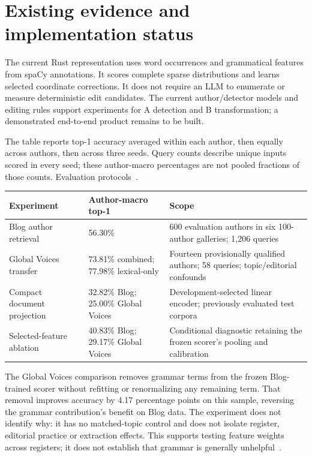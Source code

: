 \section{Existing evidence and implementation
status}\label{existing-evidence-and-implementation-status}

The current Rust representation uses word occurrences and grammatical
features from spaCy annotations. It scores complete sparse distributions
and learns selected coordinate corrections. It does not require an LLM
to enumerate or measure deterministic edit candidates. The current
author/detector models and editing rules support experiments for A
detection and B transformation; a demonstrated end-to-end product remains
to be built.

The table reports top-1 accuracy averaged within each author, then
equally across authors, then across three seeds. Query counts describe
unique inputs scored in every seed; these author-macro percentages are
not pooled fractions of those counts.
Evaluation protocols~\cite{projection,gvtransfer}.

\par\medskip\noindent
\begin{tabularx}{\linewidth}{@{}LLL@{}}
\toprule
Experiment & Author-macro top-1 & Scope \\
\midrule
Blog author retrieval & 56.30\% & 600 evaluation authors in six
100-author galleries; 1,206 queries \\
Global Voices transfer & 73.81\% combined; 77.98\% lexical-only &
Fourteen provisionally qualified authors; 58 queries; topic/editorial
confounds \\
Compact document projection & 32.82\% Blog; 25.00\% Global Voices &
Development-selected linear encoder; previously evaluated test
corpora \\
Selected-feature ablation & 40.83\% Blog; 29.17\%
Global Voices & Conditional diagnostic retaining the frozen scorer's pooling and
calibration \\
\bottomrule
\end{tabularx}
\par\medskip

The Global Voices comparison removes grammar terms from the frozen
Blog-trained scorer without refitting or renormalizing any remaining
term. That removal improves accuracy by 4.17 percentage points on this
sample, reversing the grammar contribution's benefit on Blog data.
The experiment does not identify why: it has no matched-topic control
and does not isolate register, editorial practice or extraction effects.
This supports testing feature weights across registers; it does not
establish that grammar is generally unhelpful~\cite{gvtransfer}.

